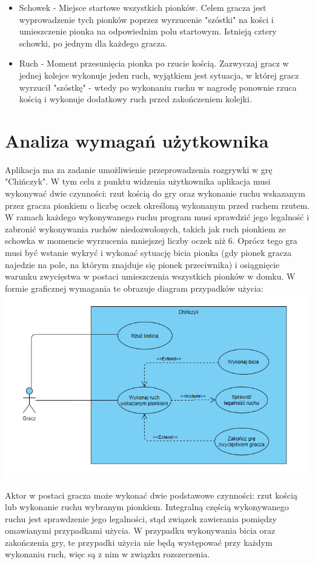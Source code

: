 \documentclass[conference]{IEEEtran}
\begin{document}
\begin{itemize}
    \item Schowek - Miejsce startowe wszystkich pionków. Celem gracza jest wyprowadzenie tych pionków poprzez wyrzucenie "szóstki" na kości i umieszczenie pionka na odpowiednim polu startowym. Istnieją cztery schowki, po jednym dla każdego gracza.
    \item Ruch - Moment przesunięcia pionka po rzucie kością. Zazwyczaj gracz w jednej kolejce wykonuje jeden ruch, wyjątkiem jest sytuacja, w której gracz wyrzucił "szóstkę" - wtedy po wykonaniu ruchu w nagrodę ponownie rzuca kością i wykonuje dodatkowy ruch przed zakończeniem kolejki.
\end{itemize}


\section{Analiza wymagań użytkownika}
Aplikacja ma za zadanie umożliwienie przeprowadzenia rozgrywki w grę "Chińczyk". W tym celu z punktu widzenia użytkownika aplikacja musi wykonywać dwie czynności: rzut kością do gry oraz wykonanie ruchu wskazanym przez gracza pionkiem o liczbę oczek określoną wykonanym przed ruchem rzutem. W ramach każdego wykonywanego ruchu program musi sprawdzić jego legalność i zabronić wykonywania ruchów niedozwolonych, takich jak ruch pionkiem ze schowka w momencie wyrzucenia mniejszej liczby oczek niż 6. Oprócz tego gra musi być wstanie wykryć i wykonać sytuację bicia pionka (gdy pionek gracza najedzie na pole, na którym znajduje się pionek przeciwnika) i osiągnięcie warunku zwycięstwa w postaci umieszczenia wszystkich pionków w domku. W formie graficznej wymagania te obrazuje diagram przypadków użycia:
\hspace*{-2cm}\includegraphics[scale=0.60]{UseCase.PNG} \par
Aktor w postaci gracza może wykonać dwie podstawowe czynności: rzut kością lub wykonanie ruchu wybranym pionkiem. Integralną częścią wykonywanego ruchu jest sprawdzenie jego legalności, stąd związek zawierania pomiędzy omawianymi przypadkami użycia. W przypadku wykonywania bicia oraz zakończenia gry, te przypadki użycia nie będą występować przy każdym wykonaniu ruch, więc są z nim w związku rozszerzenia.
\end{document}
